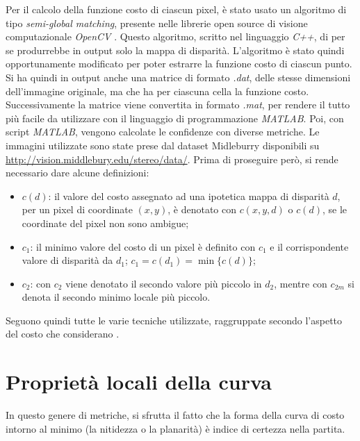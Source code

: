 \documentclass[12pt]{report}
\begin{document}
			Per il calcolo della funzione costo di ciascun pixel, è stato usato un algoritmo di tipo \textit{semi-global matching}, presente nelle librerie open source di visione computazionale \textit{OpenCV} \cite{opencv}. Questo algoritmo, scritto nel linguaggio \textit{C++}, di per se produrrebbe in output solo la mappa di disparità. L'algoritmo è stato quindi opportunamente modificato per poter estrarre la funzione costo di ciascun punto. Si ha quindi in output anche una matrice di formato \textit{.dat}, delle stesse dimensioni dell'immagine originale, ma che ha per ciascuna cella la funzione costo. Successivamente la matrice viene convertita in formato \textit{.mat}, per rendere il tutto più facile da utilizzare con il linguaggio di programmazione \textit{MATLAB}. Poi, con script \textit{MATLAB}, vengono calcolate le confidenze con diverse metriche. Le immagini utilizzate sono state prese dal dataset Midleburry \cite{dataset_2006_1,dataset_2006_2} disponibili su \url{http://vision.middlebury.edu/stereo/data/}. \newline
			Prima di proseguire però, si rende necessario dare alcune definizioni:  		
		
			\begin{itemize}
				\item $c(d)$: il valore del costo assegnato ad una ipotetica mappa di disparità $d$, per un pixel di coordinate $(x,y)$, è denotato con $c(x,y,d)$ o $c(d)$, se le coordinate del pixel non sono ambigue;
			
				\item $c_{1}$: il minimo valore del costo di un pixel è definito con $c_{1}$ e il corrispondente valore di disparità da $d_{1}$; $c_{1}=c(d_{1})=\min\{c(d)\}$;
			
				\item $c_{2}$: con $c_{2}$ viene denotato il secondo valore più piccolo in $d_{2}$, mentre con $c_{2m}$ si denota il secondo minimo locale più piccolo.
				\label{item:definizioni}
			\end{itemize}
			
			Seguono quindi tutte le varie tecniche utilizzate, raggruppate secondo l'aspetto del costo che considerano \cite{indoors_outdoors}.
		
		
		
		\section{Proprietà locali della curva}
		\label{sec:localProperties}	
			In questo genere di metriche, si sfrutta il fatto che la forma della curva di costo intorno al minimo (la nitidezza o la planarità) è indice di certezza nella partita.
			
\end{document}
